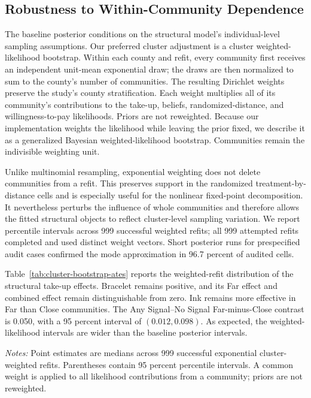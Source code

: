 \documentclass[12pt]{article}
\begin{document}
\providecommand{\StructuralRobustnessPath}{appendix/structural-robustness}

\subsection{Robustness to Within-Community Dependence}
\label{app:cluster-inference}

The baseline posterior conditions on the structural model's individual-level
sampling assumptions. Our preferred cluster adjustment is a cluster
weighted-likelihood bootstrap. Within each county and refit, every community
first receives an independent unit-mean exponential draw; the draws are then
normalized to sum to the county's number of communities. The resulting
Dirichlet weights preserve the study's county stratification. Each weight
multiplies all of its community's contributions to the take-up, beliefs,
randomized-distance, and willingness-to-pay likelihoods. Priors are not
reweighted. Because our implementation weights the likelihood while leaving
the prior fixed, we describe it as a generalized Bayesian weighted-likelihood
bootstrap. Communities remain the indivisible weighting unit.

Unlike multinomial resampling, exponential weighting does not delete
communities from a refit. This preserves support in the randomized
treatment-by-distance cells and is especially useful for the nonlinear
fixed-point decomposition. It nevertheless perturbs the influence of whole
communities and therefore allows the fitted structural objects to reflect
cluster-level sampling variation. We report percentile intervals across 999
successful weighted refits; all 999 attempted refits completed and used
distinct weight vectors. Short posterior runs for prespecified audit cases confirmed
the mode approximation in 96.7 percent of audited cells.

Table~\ref{tab:cluster-bootstrap-ates} reports the weighted-refit distribution of
the structural take-up effects. Bracelet remains positive, and its Far effect
and combined effect remain distinguishable from zero. Ink remains more
effective in Far than Close communities. The Any Signal--No Signal
Far-minus-Close contrast is 0.050, with a 95 percent interval of
$(0.012,0.098)$. As expected, the weighted-likelihood intervals are wider than
the baseline posterior intervals.

\begin{table}[htbp]
  \centering
  \scriptsize
  \caption{Structural treatment effects: cluster weighted-likelihood bootstrap}
  \label{tab:cluster-bootstrap-ates}
  
  \begin{minipage}{0.94\linewidth}
    \vspace{0.4em}\footnotesize
    \textit{Notes:} Point estimates are medians across 999 successful
    exponential cluster-weighted refits. Parentheses contain 95 percent
    percentile intervals. A common weight is applied to all likelihood
    contributions from a community; priors are not reweighted.
  \end{minipage}
\end{table}
\end{document}
